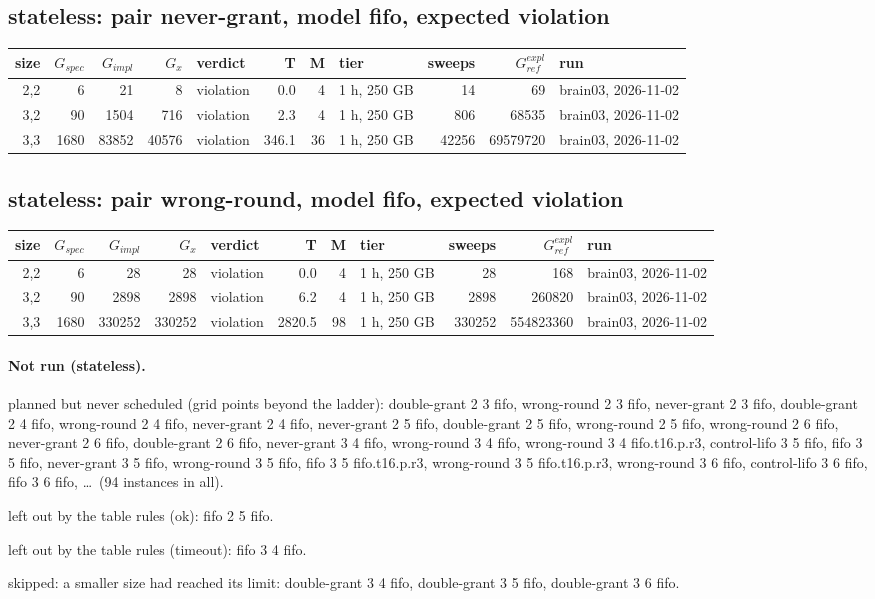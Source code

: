 \documentclass[10pt]{article}
\begin{document}
\subsection*{stateless: pair \textsf{never-grant}, model fifo, expected violation}
\begin{longtable}{@{}rrrrlrrlrrl@{}}
\toprule
size & $G_{\mathit{spec}}$ & $G_{\mathit{impl}}$ & $G_x$ & verdict & T & M & tier & sweeps & $G_{\mathit{ref}}^{\mathit{expl}}$ & run \\
\midrule
\endhead
\color{blue} 2,2 & 6 & 21 & 8 & violation & 0.0 & 4 & 1 h, 250 GB & 14 & 69 & brain03, 2026-11-02 \\
\color{blue} 3,2 & 90 & 1504 & 716 & violation & 2.3 & 4 & 1 h, 250 GB & 806 & 68535 & brain03, 2026-11-02 \\
\color{blue} 3,3 & 1680 & 83852 & 40576 & violation & 346.1 & 36 & 1 h, 250 GB & 42256 & 69579720 & brain03, 2026-11-02 \\
\bottomrule
\end{longtable}
\subsection*{stateless: pair \textsf{wrong-round}, model fifo, expected violation}
\begin{longtable}{@{}rrrrlrrlrrl@{}}
\toprule
size & $G_{\mathit{spec}}$ & $G_{\mathit{impl}}$ & $G_x$ & verdict & T & M & tier & sweeps & $G_{\mathit{ref}}^{\mathit{expl}}$ & run \\
\midrule
\endhead
\color{blue} 2,2 & 6 & 28 & 28 & violation & 0.0 & 4 & 1 h, 250 GB & 28 & 168 & brain03, 2026-11-02 \\
\color{blue} 3,2 & 90 & 2898 & 2898 & violation & 6.2 & 4 & 1 h, 250 GB & 2898 & 260820 & brain03, 2026-11-02 \\
\color{blue} 3,3 & 1680 & 330252 & 330252 & violation & 2820.5 & 98 & 1 h, 250 GB & 330252 & 554823360 & brain03, 2026-11-02 \\
\bottomrule
\end{longtable}
\paragraph{Not run (stateless).}
planned but never scheduled (grid points beyond the ladder): double-grant 2 3 fifo, wrong-round 2 3 fifo, never-grant 2 3 fifo, double-grant 2 4 fifo, wrong-round 2 4 fifo, never-grant 2 4 fifo, never-grant 2 5 fifo, double-grant 2 5 fifo, wrong-round 2 5 fifo, wrong-round 2 6 fifo, never-grant 2 6 fifo, double-grant 2 6 fifo, never-grant 3 4 fifo, wrong-round 3 4 fifo, wrong-round 3 4 fifo.t16.p.r3, control-lifo 3 5 fifo, fifo 3 5 fifo, never-grant 3 5 fifo, wrong-round 3 5 fifo, fifo 3 5 fifo.t16.p.r3, wrong-round 3 5 fifo.t16.p.r3, wrong-round 3 6 fifo, control-lifo 3 6 fifo, fifo 3 6 fifo, \ldots\ (94 instances in all).\par
left out by the table rules (ok): fifo 2 5 fifo.\par
left out by the table rules (timeout): fifo 3 4 fifo.\par
skipped: a smaller size had reached its limit: double-grant 3 4 fifo, double-grant 3 5 fifo, double-grant 3 6 fifo.\par
\end{document}
